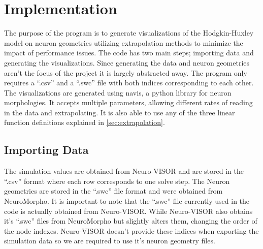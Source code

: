 
\section{Implementation}%
\label{sec:implementation}

The purpose of the program is to generate visualizations of the Hodgkin-Huxley model on neuron geometries utilizing extrapolation methods to minimize the impact of performance issues.
The code has two main steps; importing data and generating the visualizations.
Since generating the data and neuron geometries aren't the focus of the project it is largely abstracted away.
The program only requires a ``.csv'' and a ``.swc'' file with both indices corresponding to each other.
The visualizations are generated using navis\cite{navis}, a python library for neuron morphologies. 
It accepts multiple parameters, allowing different rates of reading in the data and extrapolating. 
It is also able to use any of the three linear function definitions explained in \cref{sec:extrapolation}.


\subsection{Importing Data}%
\label{sub:importing_data}
The simulation values are obtained from Neuro-VISOR\cite{neuroVISOR} and are stored in the ``.csv'' format where each row corresponds to one solve step.
The Neuron geometries are stored in the ``.swc'' file format\cite{swc} and were obtained from NeuroMorpho\cite{neuroMorpho}.
It is important to note that the ``.swc'' file currently used in the code is actually obtained from Neuro-VISOR.
While Neuro-VISOR also obtains it's ``.swc'' files from NeuroMorpho but slightly alters them, changing the order of the node indexes\cite{neuropy}.
Neuro-VISOR doesn't provide these indices when exporting the simulation data so we are required to use it's neuron geometry files.

